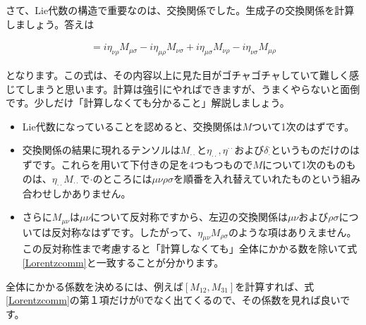 \documentclass[report,paper=a4, fontsize=12pt, line_length=16cm, number_of_lines=33,dvipdfmx]{jlreq}
\newenvironment{important}{\begin{tcolorbox}[
  colback = white,
  colframe = red!35,
  boxrule = 2mm,
  fonttitle = \bfseries,
  after = \noindent] }{\end{tcolorbox}}
\numberwithin{equation}{chapter}
\begin{document}
さて、Lie代数の構造で重要なのは、交換関係でした。生成子の交換関係を計算しましょう。答えは
\begin{important}
  \begin{align}
    [M_{\mu\nu},M_{\rho\sigma}]=i\eta_{\nu\rho}M_{\mu\sigma}-i\eta_{\mu\rho}M_{\nu\sigma}
    +i\eta_{\mu\sigma}M_{\nu\rho}-i\eta_{\nu\sigma}M_{\mu\rho}\label{Lorentzcomm}
  \end{align}
\end{important}
となります。この式は、その内容以上に見た目がゴチャゴチャしていて難しく感じてしまうと思います。計算は強引にやればできますが、うまくやらないと面倒です。少しだけ「計算しなくても分かること」解説しましょう。
\begin{itemize}
  \item Lie代数になっていることを認めると、交換関係は$M$ついて1次のはずです。
  \item 交換関係の結果に現れるテンソルは$M_{\cdot\cdot}$と$\eta_{\cdot\cdot},\eta^{\cdot\cdot}$および$\delta^{\cdot}_{\cdot}$というものだけのはずです。これらを用いて下付きの足を$4$つもつもので$M$について1次のものものは、$\eta_{\cdot\cdot}M_{\cdot\cdot}$で$\cdot$のところには$\mu\nu\rho\sigma$を順番を入れ替えていれたものという組み合わせしかありません。
  \item さらに$M_{\mu\nu}$は$\mu\nu$について反対称ですから、左辺の交換関係は$\mu\nu$および$\rho\sigma$については反対称なはずです。したがって、$\eta_{\mu\nu}M_{\rho\sigma}$のような項はありえません。この反対称性まで考慮すると「計算しなくても」全体にかかる数を除いて式\eqref{Lorentzcomm}と一致することが分かります。
\end{itemize}
全体にかかる係数を決めるには、例えば$[M_{12},M_{31}]$を計算すれば、式\eqref{Lorentzcomm}の第１項だけが$0$でなく出てくるので、その係数を見れば良いです。
\end{document}
